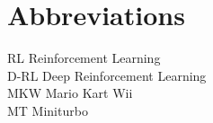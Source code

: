 
\chapter*{Abbreviations}

\begin{flushleft}

RL \hfill Reinforcement Learning
\\D-RL \hfill Deep Reinforcement Learning
\\MKW \hfill  Mario Kart Wii
\\MT \hfill  Miniturbo

\end{flushleft}